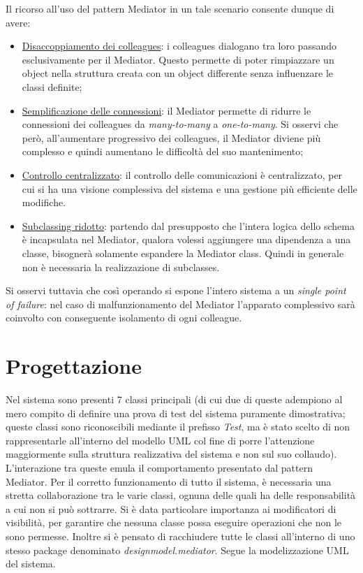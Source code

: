 \documentclass{article}
\begin{document}
\begin{sloppy}
\bigbreak
Il ricorso all'uso del pattern Mediator in un tale scenario consente dunque di avere:
\begin{itemize}
    \item \underline{Disaccoppiamento dei colleagues}: i colleagues dialogano tra loro passando esclusivamente per il Mediator. Questo permette di poter rimpiazzare un object nella struttura creata con un object differente senza influenzare le classi definite;
    \item \underline{Semplificazione delle connessioni}: il Mediator permette di ridurre le connessioni dei colleagues da \textit{many-to-many} a \textit{one-to-many}. Si osservi che però, all'aumentare progressivo dei colleagues, il Mediator diviene più complesso e quindi aumentano le difficoltà del suo mantenimento;
    \item \underline{Controllo centralizzato}: il controllo delle comunicazioni è centralizzato, per cui si ha una visione complessiva del sistema e una gestione più efficiente delle modifiche.
    \item \underline{Subclassing ridotto}:  partendo dal presupposto che l'intera logica dello schema è incapsulata nel Mediator, qualora volessi aggiungere una dipendenza a una classe, bisognerà solamente espandere la Mediator class. Quindi in generale non è necessaria la realizzazione di subclasses.
\end{itemize}

Si osservi tuttavia che così operando si espone l'intero sistema a un \textit{single point of failure}: nel caso di malfunzionamento del Mediator l'apparato complessivo sarà coinvolto con conseguente isolamento di ogni colleague.

\section{Progettazione}

Nel sistema sono presenti 7 classi principali (di cui due di queste adempiono al mero compito di definire una prova di test del sistema puramente dimostrativa; queste classi sono riconoscibili mediante il prefisso \textit{Test}, ma è stato scelto di non rappresentarle all'interno del modello UML col fine di porre l'attenzione maggiormente sulla struttura realizzativa del sistema e non sul suo collaudo). L'interazione tra queste emula il comportamento presentato dal pattern Mediator. Per il corretto funzionamento di tutto il sistema, è necessaria una stretta collaborazione tra le varie classi, ognuna delle quali ha delle responsabilità a cui non si può sottrarre. Si è data particolare importanza ai modificatori di visibilità, per garantire che nessuna classe possa eseguire operazioni che non le sono permesse. Inoltre si è pensato di racchiudere tutte le classi all'interno di uno stesso package denominato \textit{designmodel.mediator}. Segue la modelizzazione UML del sistema.


\end{sloppy}
\end{document}
